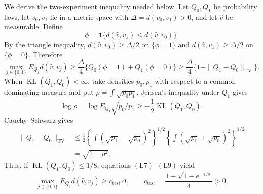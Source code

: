 We derive the two-experiment inequality needed below.  Let \(Q_0,Q_1\) be probability laws, let \(v_0,v_1\) lie in a metric space with \(\Delta=d(v_0,v_1)>0\), and let \(\widehat v\) be measurable.  Define
\[
 \phi=\mathbf1\{d(\widehat v,v_1)\leq d(\widehat v,v_0)\}.
\]
By the triangle inequality, \(d(\widehat v,v_0)\geq\Delta/2\) on \(\{\phi=1\}\) and \(d(\widehat v,v_1)\geq\Delta/2\) on \(\{\phi=0\}\).  Therefore
\[
 \max_{j\in\{0,1\}}E_{Q_j}d(\widehat v,v_j)
 \geq\frac{\Delta}{4}
 \{Q_0(\phi=1)+Q_1(\phi=0)\}
 \geq\frac{\Delta}{4}\{1-\|Q_1-Q_0\|_{\mathrm{TV}}\}.
 \tag{L7}
\]
When \(\operatorname{KL}(Q_1,Q_0)<\infty\), take densities \(p_0,p_1\) with respect to a common dominating measure and put \(\rho=\int\sqrt{p_0p_1}\).  Jensen's inequality under \(Q_1\) gives
\[
 \log\rho
 =\log E_{Q_1}\sqrt{p_0/p_1}
 \geq-\frac12\operatorname{KL}(Q_1,Q_0).
 \tag{L8}
\]
Cauchy--Schwarz gives
\[
\begin{aligned}
 \|Q_1-Q_0\|_{\mathrm{TV}}
 &\leq\frac12
 \left\{\int(\sqrt{p_1}-\sqrt{p_0})^2\right\}^{1/2}
 \left\{\int(\sqrt{p_1}+\sqrt{p_0})^2\right\}^{1/2}\\
 &=\sqrt{1-\rho^2}.
\end{aligned}
 \tag{L9}
\]
Thus, if \(\operatorname{KL}(Q_1,Q_0)\leq1/8\), equations \((\mathrm{L7})\)--\((\mathrm{L9})\) yield
\[
 \max_{j\in\{0,1\}}E_{Q_j}d(\widehat v,v_j)
 \geq c_{\mathrm{test}}\Delta,
 \qquad
 c_{\mathrm{test}}=
 \frac{1-\sqrt{1-e^{-1/8}}}{4}>0.
 \tag{L10}
\]

